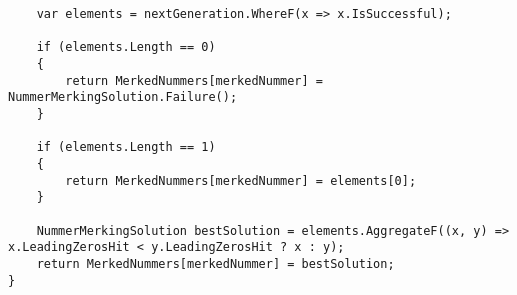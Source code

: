 \documentclass[12pt]{article}
\begin{document}
\begin{lstlisting}
    var elements = nextGeneration.WhereF(x => x.IsSuccessful);

    if (elements.Length == 0)
    {
        return MerkedNummers[merkedNummer] = NummerMerkingSolution.Failure();
    }

    if (elements.Length == 1)
    {
        return MerkedNummers[merkedNummer] = elements[0];
    }

    NummerMerkingSolution bestSolution = elements.AggregateF((x, y) => x.LeadingZerosHit < y.LeadingZerosHit ? x : y);
    return MerkedNummers[merkedNummer] = bestSolution;
}
\end{lstlisting}
\end{document}
